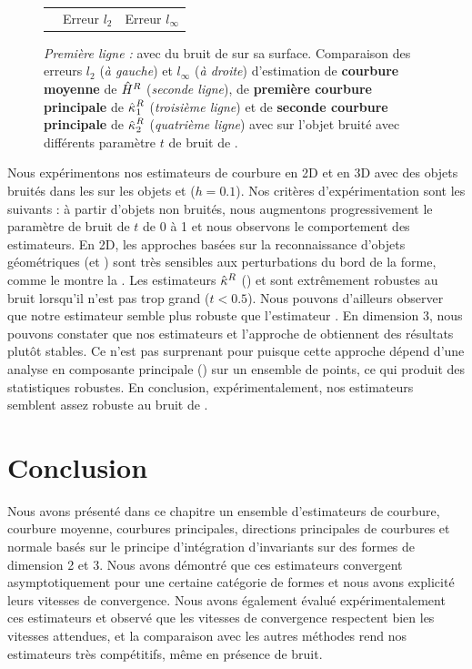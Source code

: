 \begin{figure}[ht]
\begin{center}
\begin{tabular}{@{}l c c @{}}
      &
      Erreur $l_2$ &
      Erreur $l_\infty$
    \end{tabular}
    \caption{
      \emph{Première ligne :} \RoundedCube avec du bruit de \Kanungo sur sa
      surface.
       Comparaison des erreurs $l_2$ (\emph{à gauche}) et $l_\infty$ (\emph{à
       droite}) d'estimation de \textbf{courbure moyenne} de $\hat{H}^{R}$
       (\emph{seconde ligne}), de \textbf{première courbure principale} de
       $\hat{\kappa_{}}_{1}^{R}$ (\emph{troisième ligne}) et de \textbf{seconde
       courbure principale} de $\hat{\kappa_{}}_{2}^{R}$ (\emph{quatrième ligne}) avec
       \JetFitting sur l'objet \RoundedCube bruité avec différents paramètre $t$
       de bruit de \Kanungo.
      }
      \label{fig:curv-experiments-rounded-noise}
  \end{center}
\end{figure}

Nous expérimentons nos estimateurs de courbure en 2D et en 3D avec des objets bruités
dans les
sur les objets \Ellipse et \RoundedCube ($h = 0.1$). Nos critères
d'expérimentation sont les suivants : à partir d'objets non bruités, nous
augmentons progressivement le paramètre de bruit de \Kanungo $t$ de 0 à 1 et
nous observons le comportement des estimateurs. En 2D, les approches basées sur
la reconnaissance d'objets géométriques (\MDSS et \MDCA) sont très sensibles aux
perturbations du bord de la forme, comme le montre la
. Les estimateurs $\hat{\kappa}^{R}$
(\II) et \BC sont extrêmement robustes au bruit lorsqu'il n'est pas trop grand
($t < 0.5$). Nous pouvons d'ailleurs observer que notre estimateur semble plus
robuste que l'estimateur \BC. En dimension 3, nous pouvons constater que nos
estimateurs et l'approche de \JetFitting obtiennent des résultats plutôt
stables. Ce n'est pas surprenant pour \JetFitting puisque cette approche dépend
d'une analyse en composante principale (\ACP) sur un ensemble de points, ce qui
produit des statistiques robustes. En conclusion, expérimentalement, nos
estimateurs semblent assez robuste au bruit de \Kanungo.

%
\section{Conclusion}
\label{sec:estimators:conclusion}
%
Nous avons présenté dans ce chapitre un ensemble d'estimateurs de courbure,
courbure moyenne, courbures principales, directions principales de courbures et
normale basés sur le principe d'intégration d'invariants sur des formes de
dimension 2 et 3. Nous avons démontré que ces estimateurs convergent
asymptotiquement pour une certaine catégorie de formes et nous avons explicité
leurs vitesses de convergence. Nous avons également évalué expérimentalement ces
estimateurs et observé que les vitesses de convergence respectent bien les
vitesses attendues, et la comparaison avec les autres méthodes rend nos
estimateurs très compétitifs, même en présence de bruit.


